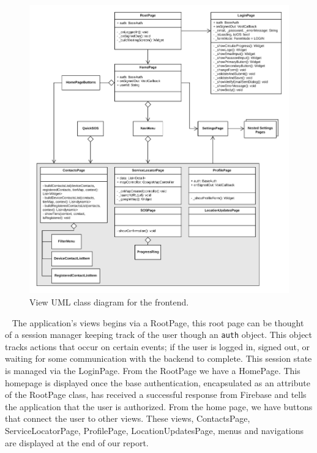 \documentclass[10pt, a4paper]{article}
\begin{document}
\begin{figure}[H]
\begin{center}
\centerline{
	\includegraphics[scale=.23]{final-diagrams/Views-UML.png}
}
\caption{View UML class diagram for the frontend.}
\end{center}	
\end{figure}

\par ~ The application's views begins via a RootPage, this root page can be thought of a session manager keeping track of the user though an \texttt{auth} object. This object tracks actions that occur on certain events; if the user is logged in, signed out, or waiting for some communication with the backend to complete. This session state is managed via the LoginPage. From the RootPage we have a HomePage. This homepage is displayed once the base authentication, encapsulated as an attribute of the RootPage class, has received a successful response from Firebase and tells the application that the user is authorized. From the home page, we have buttons that connect the user to other views. These views, ContactsPage, ServiceLocatorPage, ProfilePage, LocationUpdatesPage, menus and navigations are displayed at the end of our report. 
\end{document}
